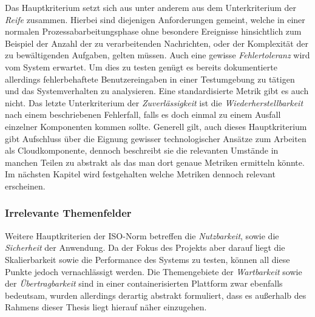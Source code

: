 Das Hauptkriterium setzt sich aus unter anderem aus dem Unterkriterium der \emph{Reife} zusammen. Hierbei sind diejenigen Anforderungen gemeint, welche in einer normalen Prozessabarbeitungsphase ohne besondere Ereignisse hinsichtlich zum Beispiel der Anzahl der zu verarbeitenden Nachrichten, oder der Komplexität der zu bewältigenden Aufgaben, gelten müssen. Auch eine gewisse \emph{Fehlertoleranz} wird vom System erwartet. Um dies zu testen genügt es bereits dokumentierte allerdings fehlerbehaftete Benutzereingaben in einer Testumgebung zu tätigen und das Systemverhalten zu analysieren. Eine standardisierte Metrik gibt es auch nicht. Das letzte Unterkriterium der \emph{Zuverlässigkeit} ist die \emph{Wiederherstellbarkeit} nach einem beschriebenen Fehlerfall, falls es doch einmal zu einem Ausfall einzelner Komponenten kommen sollte. Generell gilt, auch dieses Hauptkriterium gibt Aufschluss über die Eignung gewisser technologischer Ansätze zum Arbeiten als Cloudkomponente, dennoch beschreibt sie die relevanten Umstände in manchen Teilen zu abstrakt als das man dort genaue Metriken ermitteln könnte. Im nächsten Kapitel wird festgehalten welche Metriken dennoch relevant erscheinen. 

\subsubsection{Irrelevante Themenfelder}


Weitere Hauptkriterien der ISO-Norm betreffen die \emph{Nutzbarkeit}, sowie die \emph{Sicherheit} der Anwendung. Da der Fokus des Projekts aber darauf liegt die Skalierbarkeit sowie die Performance des Systems zu testen, können all diese Punkte jedoch vernachlässigt werden. Die Themengebiete der \emph{Wartbarkeit} sowie der \emph{Übertragbarkeit} sind in einer containerisierten Plattform zwar ebenfalls bedeutsam, wurden allerdings derartig abstrakt formuliert, dass es außerhalb des Rahmens dieser Thesis liegt hierauf näher einzugehen. 
